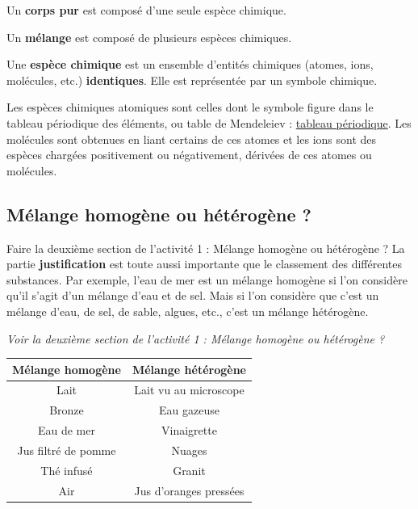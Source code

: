 \documentclass[12pt,a4paper]{article}
\begin{document}
\begin{definition}
Un \textbf{corps pur} est composé d'une seule espèce chimique.
\end{definition}


\begin{definition}
Un \textbf{mélange} est composé de plusieurs espèces chimiques.
\end{definition}

\begin{definition}
Une \textbf{espèce chimique} est un ensemble d'entités chimiques (atomes, ions, molécules, etc.) \textbf{identiques}.
Elle est représentée par un symbole chimique.
\end{definition}

\begin{remarque}
Les espèces chimiques atomiques sont celles dont le symbole figure dans le tableau périodique des éléments, ou table de Mendeleiev : \href{https://fr.wikipedia.org/wiki/Tableau_p\%C3\%A9riodique_des_\%C3\%A9l\%C3\%A9ments#/media/Fichier:Tableau_p\%C3\%A9riodique_des_\%C3\%A9l\%C3\%A9ments.svg}{tableau périodique}.
Les molécules sont obtenues en liant certains de ces atomes et les ions sont des espèces chargées positivement ou négativement, dérivées de ces atomes ou molécules.
\end{remarque}

\subsection{Mélange homogène ou hétérogène ?}

\begin{conseil}
Faire la deuxième section de l'activité 1 : Mélange homogène ou hétérogène ?
La partie \textbf{justification} est toute aussi importante que le classement des différentes substances.
Par exemple, l'eau de mer est un mélange homogène si l'on considère qu'il s'agit d'un mélange d'eau et de sel.
Mais si l'on considère que c'est un mélange d'eau, de sel, de sable, algues, etc., c'est un mélange hétérogène.
\end{conseil}

\begin{exemple}
\emph{Voir la deuxième section de l'activité 1 : Mélange homogène ou hétérogène ?}
\center
\begin{tabular}{c|c}
\textbf{Mélange homogène} & \textbf{Mélange hétérogène} \\
\hline
Lait                & Lait vu au microscope \\
Bronze              & Eau gazeuse \\
Eau de mer          & Vinaigrette \\
Jus filtré de pomme & Nuages \\
Thé infusé          & Granit \\
Air                 & Jus d'oranges pressées
\end{tabular}
\end{exemple}
\end{document}
